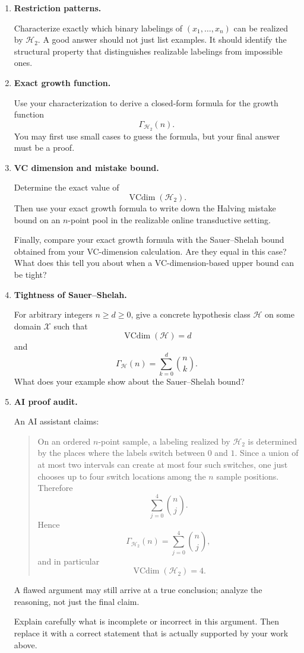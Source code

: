 \documentclass{article}
\begin{document}
\begin{enumerate}
\item \textbf{Restriction patterns.}

Characterize exactly which binary labelings of $(x_1,\dots,x_n)$ can be realized by $\mathcal{H}_2$.
A good answer should not just list examples. It should identify the structural property that distinguishes realizable labelings from impossible ones.

\item \textbf{Exact growth function.}

Use your characterization to derive a closed-form formula for the growth function
$$
\Gamma_{\mathcal{H}_2}(n).
$$
You may first use small cases to guess the formula, but your final answer must be a proof.

\item \textbf{VC dimension and mistake bound.}

Determine the exact value of
$$
\operatorname{VCdim}(\mathcal{H}_2).
$$
Then use your exact growth formula to write down the Halving mistake bound on an $n$-point pool in the realizable online transductive setting.

Finally, compare your exact growth formula with the Sauer--Shelah bound obtained from your VC-dimension calculation. Are they equal in this case? What does this tell you about when a VC-dimension-based upper bound can be tight?

\item \textbf{Tightness of Sauer--Shelah.}

For arbitrary integers $n \ge d \ge 0$, give a concrete hypothesis class $\mathcal{H}$ on some domain $\mathcal{X}$ such that
$$
\operatorname{VCdim}(\mathcal{H}) = d
$$
and
$$
\Gamma_{\mathcal{H}}(n) = \sum_{k=0}^d \binom{n}{k}.
$$
What does your example show about the Sauer--Shelah bound?

\item \textbf{AI proof audit.}

An AI assistant claims:

\begin{quote}
On an ordered $n$-point sample, a labeling realized by $\mathcal{H}_2$ is determined by the places where the labels switch between $0$ and $1$. Since a union of at most two intervals can create at most four such switches, one just chooses up to four switch locations among the $n$ sample positions. Therefore
$$
\sum_{j=0}^4 \binom{n}{j}.
$$
Hence
$$
\Gamma_{\mathcal{H}_2}(n) = \sum_{j=0}^4 \binom{n}{j},
$$
and in particular
$$
\operatorname{VCdim}(\mathcal{H}_2) = 4.
$$
\end{quote}

A flawed argument may still arrive at a true conclusion; analyze the reasoning, not just the final claim.

Explain carefully what is incomplete or incorrect in this argument. Then replace it with a correct statement that is actually supported by your work above.
\end{enumerate}
\end{document}
